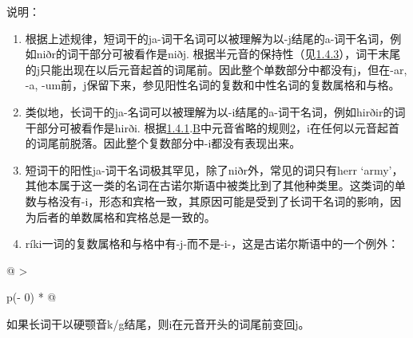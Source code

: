 说明：

\begin{enumerate}
  \def\labelenumi{\arabic{enumi})}
  \item
        根据上述规律，短词干的ja-词干名词可以被理解为以-j结尾的a-词干名词，例如niðr的词干部分可被看作是niðj.
        根据半元音的保持性（见\hyperref[ux534aux5143ux97f3ux7684ux4fddux6301ux6027]{1.4.3}），词干末尾的j只能出现在以后元音起首的词尾前。因此整个单数部分中都没有j，但在-ar,
        -a, -um前，j保留下来，参见阳性名词的复数和中性名词的复数属格和与格。
  \item
        类似地，长词干的ja-名词可以被理解为以-i结尾的a-词干名词，例如hirðir的词干部分可被看作是hirði.
        根据\hyperref[ux5143ux97f3ux7684ux97f3ux53d8]{1.4.1}.\hyperref[_Ref115693879]{B}中元音省略的规则\hyperref[_Ref115709879]{2}，i在任何以元音起首的词尾前脱落。因此整个复数部分中-i都没有表现出来。
  \item
        短词干的阳性ja-词干名词极其罕见，除了niðr外，常见的词只有herr
        `army'，其他本属于这一类的名词在古诺尔斯语中被类比到了其他种类里。这类词的单数与格没有-i，形态和宾格一致，其原因可能是受到了长词干名词的影响，因为后者的单数属格和宾格总是一致的。
  \item
        ríki一词的复数属格和与格中有-j-而不是-i-，这是古诺尔斯语中的一个例外：
\end{enumerate}

\begin{longtable}[]{@{}
  >{\raggedright\arraybackslash}p{(\columnwidth - 0\tabcolsep) * }@{}}
  \toprule\noalign{}
  \begin{minipage}[b]{\linewidth}\raggedright
    如果长词干以硬颚音k/g结尾，则i在元音开头的词尾前变回j。
  \end{minipage} \\
  \midrule\noalign{}
  \endhead
  \bottomrule\noalign{}
  \endlastfoot
\end{longtable}

